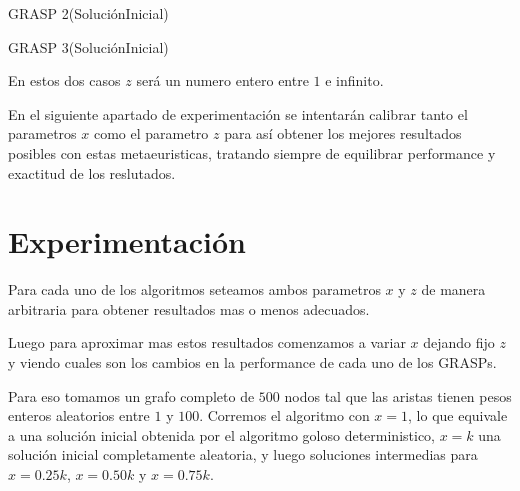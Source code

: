 \begin{algorithm}
  	\begin{algorithmic}[1]\parskip=1mm
		 \caption{ GRASP 2(SoluciónInicial) }
	\end{algorithmic}
\end{algorithm}

\begin{algorithm}
  	\begin{algorithmic}[1]\parskip=1mm
		 \caption{ GRASP 3(SoluciónInicial) }
	\end{algorithmic}
\end{algorithm}

En estos dos casos $z$ será un numero entero entre $1$ e infinito.

En el siguiente apartado de experimentación se intentarán calibrar tanto el parametros $x$ como el parametro $z$ para así obtener los mejores resultados posibles con estas metaeuristicas, tratando siempre de equilibrar performance y exactitud de los reslutados.

\section{Experimentación}

Para cada uno de los algoritmos seteamos ambos parametros $x$ y $z$ de manera arbitraria para obtener resultados mas o menos adecuados.

Luego para aproximar mas estos resultados comenzamos a variar $x$ dejando fijo $z$ y viendo cuales son los cambios en la performance de cada uno de los GRASPs.

Para eso tomamos un grafo completo de $500$ nodos tal que las aristas tienen pesos enteros aleatorios entre $1$ y $100$. Corremos el algoritmo con $x=1$, lo que equivale a una solución inicial obtenida por el algoritmo goloso deterministico, $x=k$ una solución inicial completamente aleatoria, y luego soluciones intermedias para $x = 0.25 k$, $x = 0.50k$ y $x = 0.75 k$.

